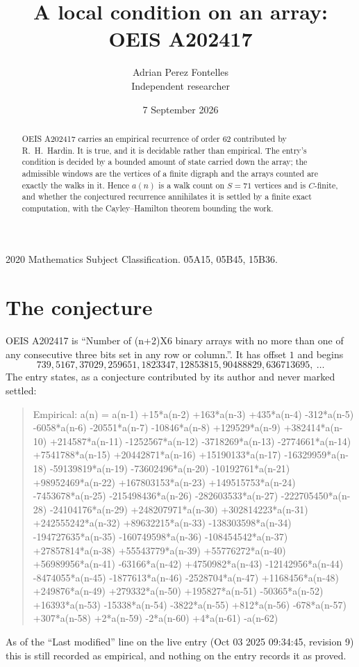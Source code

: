 \documentclass[11pt,a4paper]{article}
\title{A local condition on an array: OEIS A202417}
\author{Adrian Perez Fontelles\\ \small Independent researcher}
\date{7 September 2026}
\theoremstyle{plain}
\theoremstyle{definition}
\begin{document}
\maketitle

\begin{abstract}
OEIS A202417 carries an empirical recurrence of order $62$ contributed by R.~H.~Hardin. It is
true, and it is decidable rather than empirical. The entry's condition is decided by a bounded amount of state carried down the array; the
admissible windows are the vertices of a finite digraph and the arrays counted are exactly the
walks in it. Hence $a(n)$ is a walk count on $S=71$ vertices and is $C$-finite, and whether the
conjectured recurrence annihilates it is settled by a finite exact computation, with the
Cayley--Hamilton theorem bounding the work.
\end{abstract}

\noindent\small 2020 Mathematics Subject Classification. 05A15, 05B45, 15B36.\normalsize

\section{The conjecture}

OEIS A202417 is ``Number of (n+2)X6 binary arrays with no more than one of any consecutive three bits set in any row or column.''. It has offset $1$ and begins
\[
739, 5167, 37029, 259651, 1823347, 12853815, 90488829, 636713695,\ \dots
\]
The entry states, as a conjecture contributed by its author and never marked settled:
\begin{quote}
Empirical: a(n) = a(n-1) +15*a(n-2) +163*a(n-3) +435*a(n-4) -312*a(n-5) -6058*a(n-6) -20551*a(n-7) -10846*a(n-8) +129529*a(n-9) +382414*a(n-10) +214587*a(n-11) -1252567*a(n-12) -3718269*a(n-13) -2774661*a(n-14) +7541788*a(n-15) +20442871*a(n-16) +15190133*a(n-17) -16329959*a(n-18) -59139819*a(n-19) -73602496*a(n-20) -10192761*a(n-21) +98952469*a(n-22) +167803153*a(n-23) +149515753*a(n-24) -7453678*a(n-25) -215498436*a(n-26) -282603533*a(n-27) -222705450*a(n-28) -24104176*a(n-29) +248207971*a(n-30) +302814223*a(n-31) +242555242*a(n-32) +89632215*a(n-33) -138303598*a(n-34) -194727635*a(n-35) -160749598*a(n-36) -108454542*a(n-37) +27857814*a(n-38) +55543779*a(n-39) +55776272*a(n-40) +56989956*a(n-41) -63166*a(n-42) +4750982*a(n-43) -12142956*a(n-44) -8474055*a(n-45) -1877613*a(n-46) -2528704*a(n-47) +1168456*a(n-48) +249876*a(n-49) +279332*a(n-50) +195827*a(n-51) -50365*a(n-52) +16393*a(n-53) -15338*a(n-54) -3822*a(n-55) +812*a(n-56) -678*a(n-57) +307*a(n-58) +2*a(n-59) -2*a(n-60) +4*a(n-61) -a(n-62)
\end{quote}
As of the ``Last modified'' line on the live entry (Oct 03 2025 09:34:45, revision 9) this is still
recorded as empirical, and nothing on the entry records it as proved.
\end{document}
